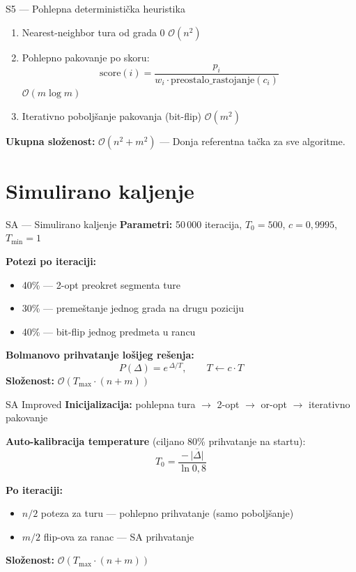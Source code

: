 \documentclass[aspectratio=169]{beamer}
\begin{document}
\begin{frame}{S5 --- Pohlepna deterministička heuristika}
  \begin{enumerate}
    \item Nearest-neighbor tura od grada 0 \hfill $\mathcal{O}(n^2)$
    \item Pohlepno pakovanje po skoru:
      \[
        \text{score}(i) = \frac{p_i}{w_i \cdot \text{preostalo\_rastojanje}(c_i)}
      \]
      \hfill $\mathcal{O}(m \log m)$
    \item Iterativno poboljšanje pakovanja (bit-flip) \hfill $\mathcal{O}(m^2)$
  \end{enumerate}

  \bigskip
  \textbf{Ukupna složenost:} $\mathcal{O}(n^2 + m^2)$ \quad --- \quad
  Donja referentna tačka za sve algoritme.
\end{frame}

\section{Simulirano kaljenje}

\begin{frame}{SA --- Simulirano kaljenje}
  \textbf{Parametri:} 50\,000 iteracija, $T_0 = 500$, $c = 0{,}9995$, $T_{\min} = 1$

  \bigskip
  \textbf{Potezi po iteraciji:}
  \begin{itemize}
    \item 40\% --- 2-opt preokret segmenta ture
    \item 30\% --- premeštanje jednog grada na drugu poziciju
    \item 40\% --- bit-flip jednog predmeta u rancu
  \end{itemize}

  \bigskip
  \textbf{Bolmanovo prihvatanje lošijeg rešenja:}
  \[
    P(\Delta) = e^{\,\Delta / T}, \qquad T \leftarrow c \cdot T
  \]
  \medskip
  \textbf{Složenost:} $\mathcal{O}(T_{\max} \cdot (n + m))$
\end{frame}

\begin{frame}{SA Improved}
  \textbf{Inicijalizacija:} pohlepna tura $\to$ 2-opt $\to$ or-opt $\to$ iterativno pakovanje

  \bigskip
  \textbf{Auto-kalibracija temperature} (ciljano 80\% prihvatanje na startu):
  \[
    T_0 = \frac{-\,\overline{|\Delta|}}{\ln 0{,}8}
  \]

  \bigskip
  \textbf{Po iteraciji:}
  \begin{itemize}
    \item $n/2$ poteza za turu --- pohlepno prihvatanje (samo poboljšanje)
    \item $m/2$ flip-ova za ranac --- SA prihvatanje
  \end{itemize}

  \medskip
  \textbf{Složenost:} $\mathcal{O}(T_{\max} \cdot (n + m))$
\end{frame}
\end{document}
